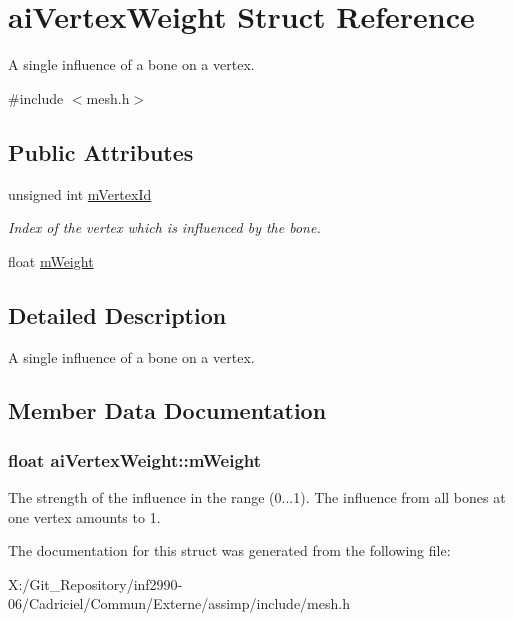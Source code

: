 \hypertarget{structai_vertex_weight}{\section{ai\-Vertex\-Weight Struct Reference}
\label{structai_vertex_weight}
}


A single influence of a bone on a vertex.  




{\ttfamily \#include $<$mesh.\-h$>$}

\subsection*{Public Attributes}
\begin{DoxyCompactItemize}
\item 
\hypertarget{structai_vertex_weight_af6269cf6a0f02e5ae870a72046d58f4f}{unsigned int \hyperlink{structai_vertex_weight_af6269cf6a0f02e5ae870a72046d58f4f}{m\-Vertex\-Id}}\label{structai_vertex_weight_af6269cf6a0f02e5ae870a72046d58f4f}

\begin{DoxyCompactList}\small\item\em Index of the vertex which is influenced by the bone. \end{DoxyCompactList}\item 
float \hyperlink{structai_vertex_weight_abab9c49baabc2cafef9ac840f59e61b8}{m\-Weight}
\end{DoxyCompactItemize}


\subsection{Detailed Description}
A single influence of a bone on a vertex. 

\subsection{Member Data Documentation}
\hypertarget{structai_vertex_weight_abab9c49baabc2cafef9ac840f59e61b8}{
\subsubsection[{m\-Weight}]{\setlength{\rightskip}{0pt plus 5cm}float ai\-Vertex\-Weight\-::m\-Weight}}\label{structai_vertex_weight_abab9c49baabc2cafef9ac840f59e61b8}
The strength of the influence in the range (0...1). The influence from all bones at one vertex amounts to 1. 

The documentation for this struct was generated from the following file\-:\begin{DoxyCompactItemize}
\item 
X\-:/\-Git\-\_\-\-Repository/inf2990-\/06/\-Cadriciel/\-Commun/\-Externe/assimp/include/mesh.\-h\end{DoxyCompactItemize}
